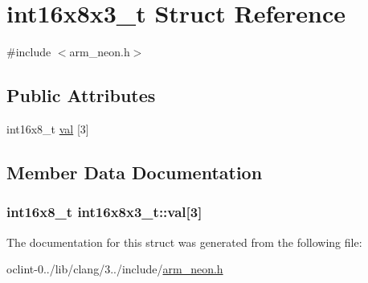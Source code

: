 \hypertarget{structint16x8x3__t}{\section{int16x8x3\-\_\-t Struct Reference}
\label{structint16x8x3__t}
}


{\ttfamily \#include $<$arm\-\_\-neon.\-h$>$}

\subsection*{Public Attributes}
\begin{DoxyCompactItemize}
\item 
int16x8\-\_\-t \hyperlink{structint16x8x3__t_a047b6615d0ac1ce12310df3237642297}{val} \mbox{[}3\mbox{]}
\end{DoxyCompactItemize}


\subsection{Member Data Documentation}
\hypertarget{structint16x8x3__t_a047b6615d0ac1ce12310df3237642297}{
\subsubsection[{val}]{\setlength{\rightskip}{0pt plus 5cm}int16x8\-\_\-t int16x8x3\-\_\-t\-::val\mbox{[}3\mbox{]}}}\label{structint16x8x3__t_a047b6615d0ac1ce12310df3237642297}


The documentation for this struct was generated from the following file\-:\begin{DoxyCompactItemize}
\item 
oclint-\/0../lib/clang/3../include/\hyperlink{arm__neon_8h}{arm\-\_\-neon.\-h}\end{DoxyCompactItemize}
